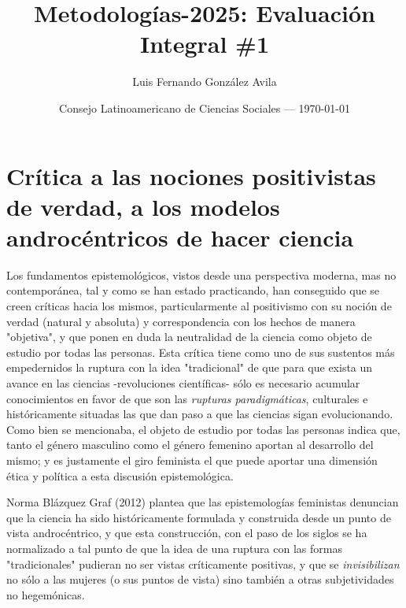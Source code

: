 \documentclass{article}
\title{Metodologías-2025: Evaluación Integral \#1} %
\author{Luis Fernando González Avila} %
\date{Consejo Latinoamericano de Ciencias Sociales --- \today} %
\begin{document}
\maketitle %


\section{Crítica a las nociones positivistas de verdad, a los modelos androcéntricos de hacer ciencia} %

Los fundamentos epistemológicos, vistos desde una perspectiva moderna, mas no contemporánea, tal y como se han estado practicando, han conseguido que se creen críticas hacia los mismos, particularmente al positivismo con su noción de verdad (natural y absoluta) y correspondencia con los hechos de manera "objetiva", y que ponen en duda la neutralidad de la ciencia como objeto de estudio por todas las personas. Esta crítica tiene como uno de sus sustentos más empedernidos la ruptura con la idea "tradicional" de que para que exista un avance en las ciencias -revoluciones científicas- sólo es necesario acumular conocimientos en favor de que son las \textit{rupturas paradigmáticas}, culturales e históricamente situadas las que dan paso a que las ciencias sigan evolucionando.\\

\noindent Como bien se mencionaba, el objeto de estudio por todas las personas indica que, tanto el género masculino como el género femenino aportan al desarrollo del mismo; y es justamente el giro feminista el que puede aportar una dimensión ética y política a esta discusión epistemológica.

\begin{info} %
	Norma Blázquez Graf (2012) plantea que las epistemologías feministas denuncian que la ciencia ha sido históricamente formulada y construida desde un punto de vista androcéntrico, y que esta construcción, con el paso de los siglos se ha normalizado a tal punto de que la idea de una ruptura con las formas "tradicionales" pudieran no ser vistas críticamente positivas, y que se \textit{invisibilizan} no sólo a las mujeres (o sus puntos de vista) sino también a otras subjetividades no hegemónicas.
\end{info}
\end{document}
